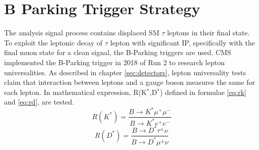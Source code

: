 \clearpage
\chapter{B Parking Trigger Strategy}\label{sec:triggers}
The analysis signal process contains displaced SM $\tau$ leptons in their final state.
To exploit the leptonic decay of $\tau$ lepton with significant IP, specifically with the final muon state for a clean signal, the B-Parking triggers are used.
CMS implemented the B-Parking trigger in 2018 of Run 2 to research lepton universalities.
As described in chapter \ref{sec:detectors}, lepton universality tests claim that interaction between leptons and a gauge boson measures the same for each lepton.
In mathematical expression, R(K$^{*}$,D$^{*}$) defined in formulae \ref{eq:rk} and \ref{eq:rd}, are tested.
\begin{equation}
\label{eq:rk}
	R(K^{*})  = \frac{B\to K^{*}\mu^{+}\mu^{-}}{B\to K^{*}e^{+}e^{-}} 
\end{equation}
\begin{equation}
\label{eq:rd}
	R(D^{*})  = \frac{B\to D^{*}\tau^{\pm}\nu}{B\to D^{*}\mu^{\pm}\nu} 
\end{equation}

